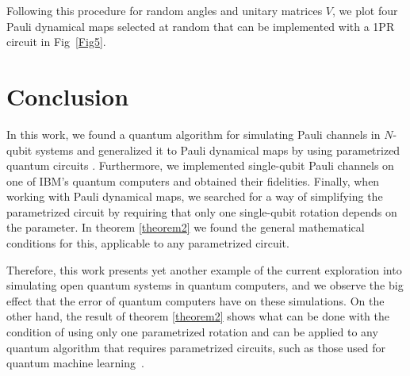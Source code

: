 \documentclass[10pt,letterpaper]{article} %
\newcommand{\fref}[1]{Fig~\ref{#1}}
\begin{document}
Following this procedure for random
angles and unitary matrices $V$, 
we plot four Pauli dynamical maps  selected at random
that can be implemented with a 1PR circuit in \fref{Fig5}. 

\section{Conclusion} %


In this work, we found a quantum algorithm for 
simulating Pauli channels in $N$-qubit systems and
generalized it to Pauli dynamical maps
by using parametrized quantum circuits  .
Furthermore, we implemented single-qubit Pauli channels
on one of IBM's quantum computers
and obtained their fidelities. 
Finally, when working with Pauli dynamical maps,
we searched for a way of simplifying the parametrized circuit 
by requiring that only one single-qubit rotation depends on the parameter.
In theorem \ref{theorem2} we found the general mathematical conditions for 
this, applicable to any parametrized circuit.

Therefore, this work presents yet another example of the current
exploration into simulating open quantum
systems in quantum computers,
and we observe the big effect that the error of quantum computers have
on these simulations. 
On the other hand, the result
of theorem \ref{theorem2}
shows what can be done with the condition of using only one
parametrized rotation and
can be applied to any quantum algorithm that requires parametrized circuits,
such as those used for quantum machine learning~\cite{Benedetti}.
\end{document}
